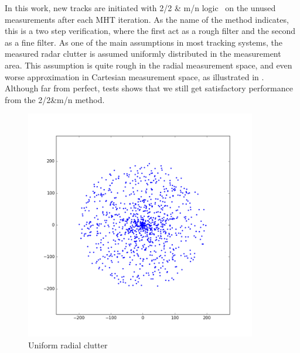 In this work, new tracks are initiated with 2/2 \& m/n logic~\cite{Vo2015} on the unused measurements after each MHT iteration. As the name of the method indicates, this is a two step verification, where the first act as a rough filter and the second as a fine filter. As one of the main assumptions in most tracking systems, the measured radar clutter is assumed uniformly distributed in the measurement area. This assumption is quite rough in the radial measurement space, and even worse approximation in Cartesian measurement space, as illustrated in .  Although far from perfect, tests shows that we still get satisfactory performance from the 2/2\&m/n method.
\begin{figure}
\centering
\begin{minipage}{0.45\textwidth}
\includegraphics[width=0.9\textwidth]{Figures/clutterRadial.png}
\caption{Uniform radial clutter}\label{fig:clutter_radial}
\end{minipage}\hfill
\begin{minipage}{0.45\textwidth}

\end{minipage}
\end{figure}
